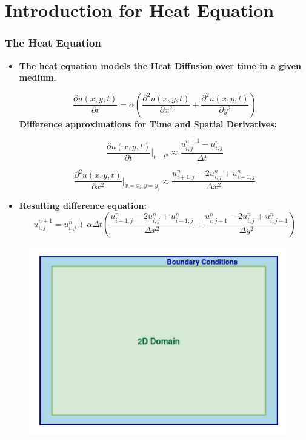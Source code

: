 \documentclass[9pt]{beamer}
\begin{document}
\section{Introduction for Heat Equation} %
\begin{frame}
\vspace{-0.1\baselineskip} %

\frametitle{The Heat Equation}
\scriptsize
\begin{itemize}
    \item \textbf{The heat equation models the Heat Diffusion over time in a given medium.}

    \[
    \frac{\partial u(x, y, t)}{\partial t} = \alpha \left( \frac{\partial^2 u(x, y, t)}{\partial x^2} + \frac{\partial^2 u(x, y, t)}{\partial y^2} \right)
    \]
\textbf{Difference approximations for Time and Spatial Derivatives:}
\begin{minipage}{0.45\textwidth}

     \[
\frac{\partial u(x, y, t)}{\partial t}\Bigg|_{t = t^n} \approx \frac{u_{i,j}^{n+1} - u_{i,j}^n}{\Delta t}
\]
\end{minipage}
\begin{minipage}{0.45\textwidth}

\[
\frac{\partial^2 u(x, y, t)}{\partial x^2}\Bigg|_{x = x_i, y = y_j} \approx \frac{u_{i+1,j}^n - 2u_{i,j}^n + u_{i-1,j}^n}{\Delta x^2}
\]
\end{minipage}
\item \textbf{Resulting difference equation:}
\[
u_{i,j}^{n+1} = u_{i,j}^n + \alpha \Delta t \left( \frac{u_{i+1,j}^n - 2u_{i,j}^n + u_{i-1,j}^n}{\Delta x^2} + \frac{u_{i,j+1}^n - 2u_{i,j}^n + u_{i,j-1}^n}{\Delta y^2} \right)
\]
\end{itemize}
\vspace{-0.3\baselineskip}
\begin{figure}
    \centering
    \includegraphics[width=0.45\linewidth,height=0.35\linewidth]{Screenshot from 2024-08-30 14-04-56.png}
\end{figure}
\end{frame}
\end{document}
